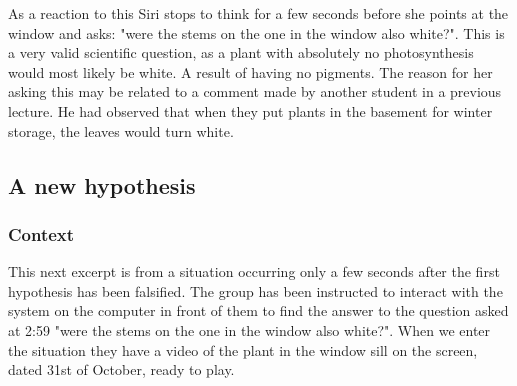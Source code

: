 As a reaction to this Siri stops to think for a few seconds before she points at the window and asks: "were the stems on the one in the window also white?". This is a very valid scientific question, as a plant with absolutely no photosynthesis would most likely be white. A result of having no pigments. The reason for her asking this may be related to a comment made by another student in a previous lecture. He had observed that when they put plants in the basement for winter storage, the leaves would turn white. 

\subsection{A new hypothesis}
\subsubsection*{Context}
This next excerpt is from a situation occurring only a few seconds after the first hypothesis has been falsified. The group has been instructed to interact with the system on the computer in front of them to find the answer to the question asked at 2:59 "were the stems on the one in the window also white?". When we enter the situation they have a video of the plant in the window sill on the screen, dated 31st of October, ready to play. 


